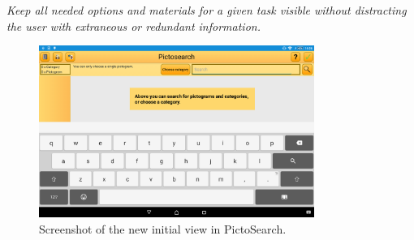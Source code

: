 \begin{displayquote}
\textit{Keep all needed options and materials for a given task visible without distracting the user with extraneous or redundant information.} \cite[p.~55]{DESIGNBOOK}
\end{displayquote}

\begin{figure}[h]
    \centering
    \includegraphics[width=0.8\textwidth]{figures/img/screenshots/new_startup.png}
    \caption{Screenshot of the new initial view in PictoSearch.}\label{fig:screenshot_newstartup}
\end{figure}


